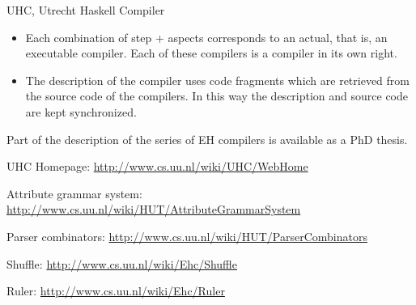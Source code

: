 \begin{hcarentry}[section]{UHC, Utrecht Haskell Compiler}
\begin{itemize}
\item
  Each combination of step + aspects corresponds to an actual, that is, an executable compiler.
  Each of these compilers is a compiler in its own right.

\item
  The description of the compiler uses code fragments which are
  retrieved from the source code of the compilers.
  In this way the description and source code are kept synchronized.
\end{itemize}

Part of the description of the series of EH compilers is available
as a PhD thesis.

\FurtherReading
\begin{compactitem}
\item UHC Homepage:
\url{http://www.cs.uu.nl/wiki/UHC/WebHome}

\item Attribute grammar system:
\url{http://www.cs.uu.nl/wiki/HUT/AttributeGrammarSystem}

\item Parser combinators:
\url{http://www.cs.uu.nl/wiki/HUT/ParserCombinators}

\item Shuffle:
\url{http://www.cs.uu.nl/wiki/Ehc/Shuffle}

\item Ruler:
\url{http://www.cs.uu.nl/wiki/Ehc/Ruler}
\end{compactitem}
\end{hcarentry}

